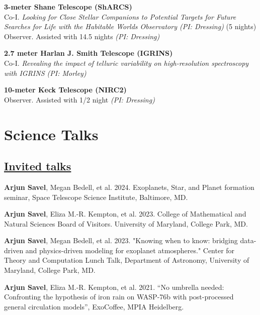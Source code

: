 \documentclass[letterpaper,10.5pt]{article}
\newcommand{\shorterSection}[1]{\vspace{-10pt}\section{#1}}
\newcommand{\shortershorterSection}[1]{\vspace{-10pt}\subsection{#1}}
\begin{document}
\begin{list}{}{\cvlist}
     \item[{\color{numcolor}}]\textbf{3-meter Shane Telescope (ShARCS)} \\
     Co-I.  \textit{Looking for Close Stellar Companions to Potential Targets for Future Searches for Life with the Habitable Worlds Observatory (PI: Dressing)} (5 nights)\\
     Observer. Assisted with 14.5 nights \textit{(PI: Dressing)}


     \item[{\color{numcolor}}]\textbf{2.7 meter Harlan J. Smith Telescope (IGRINS)} \\
     Co-I. \textit{Revealing the impact of telluric variability on high-resolution spectroscopy with IGRINS (PI: Morley)}

     
     \item[{\color{numcolor}}]\textbf{10-meter Keck Telescope (NIRC2)} \\
     Observer. Assisted with 1/2 night \textit{(PI: Dressing)}
  
  \end{list}


\shorterSection{Science Talks}
\vspace{12pt}
\shortershorterSection{\underline{Invited talks}}
\small
  \begin{list}{}{\cvlist}

  \item[{\color{numcolor}\scriptsize4}] \textbf{Arjun Savel}, Megan Bedell, et al. 2024. Exoplanets, Star, and Planet formation seminar, Space Telescope Science Institute, Baltimore, MD.

  \item[{\color{numcolor}\scriptsize3}] \textbf{Arjun Savel}, Eliza M.-R. Kempton, et al. 2023. College of Mathematical and Natural Sciences Board of Visitors. University of Maryland, College Park, MD.

  

  \item[{\color{numcolor}\scriptsize2}] \textbf{Arjun Savel}, Megan Bedell, et al. 2023. "Knowing when to know: bridging data-driven and physics-driven modeling for exoplanet atmospheres." Center for Theory and Computation Lunch Talk, Department of Astronomy, University of Maryland, College Park, MD.

   \item[{\color{numcolor}\scriptsize1}] \textbf{Arjun Savel}, Eliza M.-R. Kempton, et al. 2021. ``No umbrella needed: Confronting the hypothesis of iron rain on WASP-76b with post-processed general circulation models'', ExoCoffee, MPIA Heidelberg.


  \end{list}
\end{document}
